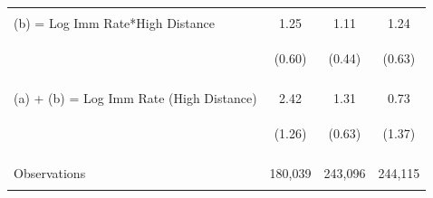 \begin{center}
\begin{tabular}{lccc}
 & \begin{footnotesize}[0.404]\end{footnotesize} & \begin{footnotesize}[0.800]\end{footnotesize} & \begin{footnotesize}[0.747]\end{footnotesize}\\
\noalign{\smallskip}(b) = Log Imm Rate*High Distance & 1.25 & 1.11 & 1.24\\
 & \begin{footnotesize}(0.60)\end{footnotesize} & \begin{footnotesize}(0.44)\end{footnotesize} & \begin{footnotesize}(0.63)\end{footnotesize}\\
 & \begin{footnotesize}[0.040]\end{footnotesize} & \begin{footnotesize}[0.013]\end{footnotesize} & \begin{footnotesize}[0.051]\end{footnotesize}\\
\noalign{\smallskip}(a) + (b) = Log Imm Rate (High Distance) & 2.42 & 1.31 & 0.73\\
 & \begin{footnotesize}(1.26)\end{footnotesize} & \begin{footnotesize}(0.63)\end{footnotesize} & \begin{footnotesize}(1.37)\end{footnotesize}\\
 & \begin{footnotesize}[0.059]\end{footnotesize} & \begin{footnotesize}[0.039]\end{footnotesize} & \begin{footnotesize}[0.594]\end{footnotesize}\\
\noalign{\smallskip}Observations & 180,039 & 243,096 & 244,115\\
 & \begin{footnotesize}\end{footnotesize} & \begin{footnotesize}\end{footnotesize} & \begin{footnotesize}\end{footnotesize}\\

\end{tabular}
\end{center}

